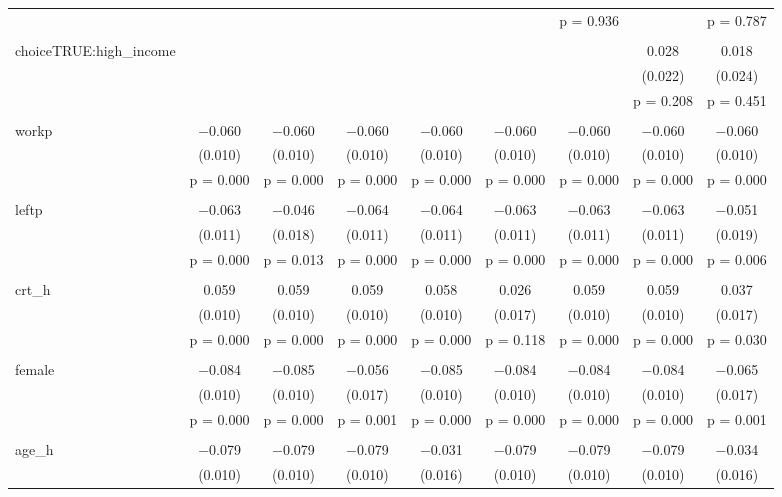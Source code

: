 \begin{table}[!htbp]
\begin{tabular}{@{\extracolsep{5pt}}lcccccccc}
  &  &  &  &  &  & p = 0.936 &  & p = 0.787 \\ 
  & & & & & & & & \\ 
 choiceTRUE:high\_income &  &  &  &  &  &  & 0.028 & 0.018 \\ 
  &  &  &  &  &  &  & (0.022) & (0.024) \\ 
  &  &  &  &  &  &  & p = 0.208 & p = 0.451 \\ 
  & & & & & & & & \\ 
 workp & $-$0.060 & $-$0.060 & $-$0.060 & $-$0.060 & $-$0.060 & $-$0.060 & $-$0.060 & $-$0.060 \\ 
  & (0.010) & (0.010) & (0.010) & (0.010) & (0.010) & (0.010) & (0.010) & (0.010) \\ 
  & p = 0.000 & p = 0.000 & p = 0.000 & p = 0.000 & p = 0.000 & p = 0.000 & p = 0.000 & p = 0.000 \\ 
  & & & & & & & & \\ 
 leftp & $-$0.063 & $-$0.046 & $-$0.064 & $-$0.064 & $-$0.063 & $-$0.063 & $-$0.063 & $-$0.051 \\ 
  & (0.011) & (0.018) & (0.011) & (0.011) & (0.011) & (0.011) & (0.011) & (0.019) \\ 
  & p = 0.000 & p = 0.013 & p = 0.000 & p = 0.000 & p = 0.000 & p = 0.000 & p = 0.000 & p = 0.006 \\ 
  & & & & & & & & \\ 
 crt\_h & 0.059 & 0.059 & 0.059 & 0.058 & 0.026 & 0.059 & 0.059 & 0.037 \\ 
  & (0.010) & (0.010) & (0.010) & (0.010) & (0.017) & (0.010) & (0.010) & (0.017) \\ 
  & p = 0.000 & p = 0.000 & p = 0.000 & p = 0.000 & p = 0.118 & p = 0.000 & p = 0.000 & p = 0.030 \\ 
  & & & & & & & & \\ 
 female & $-$0.084 & $-$0.085 & $-$0.056 & $-$0.085 & $-$0.084 & $-$0.084 & $-$0.084 & $-$0.065 \\ 
  & (0.010) & (0.010) & (0.017) & (0.010) & (0.010) & (0.010) & (0.010) & (0.017) \\ 
  & p = 0.000 & p = 0.000 & p = 0.001 & p = 0.000 & p = 0.000 & p = 0.000 & p = 0.000 & p = 0.001 \\ 
  & & & & & & & & \\ 
 age\_h & $-$0.079 & $-$0.079 & $-$0.079 & $-$0.031 & $-$0.079 & $-$0.079 & $-$0.079 & $-$0.034 \\ 
  & (0.010) & (0.010) & (0.010) & (0.016) & (0.010) & (0.010) & (0.010) & (0.016) \\ 

\end{tabular}
\end{table}
